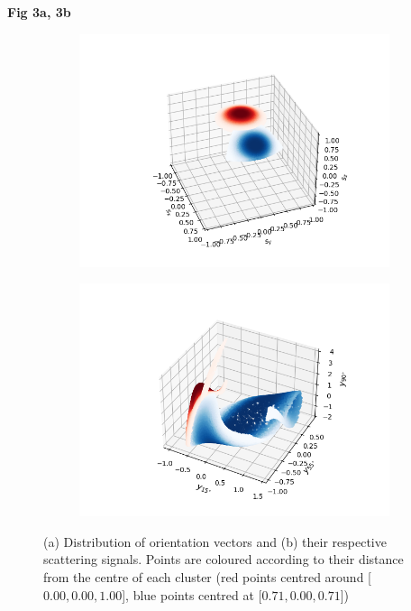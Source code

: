 \documentclass[final,  3p]{elsarticle}
\begin{document}
\begin{center}
	\bf{Fig 3a, 3b}
\end{center}
\begin{figure}[h]
	\centering
	\begin{subfigure}{0.4\textwidth}
		\subcaption{}
		\includegraphics[width=\textwidth]{./Images/fig3a.png}
	\end{subfigure}
	\begin{subfigure}{0.4\textwidth}
		\subcaption{}
		\includegraphics[width=\textwidth]{./Images/fig3b.png}
	\end{subfigure}
	\caption{(a) Distribution of orientation vectors and (b) their respective scattering signals. Points are coloured according to their distance from the centre of each cluster (red points centred around [$0.00, 0.00, 1.00$], blue points centred at [$0.71, 0.00, 0.71$])}
	\label{fig:mixing}
\end{figure}
\end{document}
